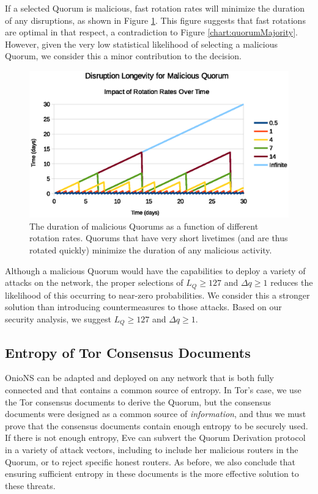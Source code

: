 If a selected Quorum is malicious, fast rotation rates will minimize the duration of any disruptions, as shown in Figure \ref{chart:quorumLongevity}. This figure suggests that fast rotations are optimal in that respect, a contradiction to Figure \ref{chart:quorumMajority}. However, given the very low statistical likelihood of selecting a malicious Quorum, we consider this a minor contribution to the decision.

\begin{figure}[htbp]
	\centering
	\includegraphics[width=1\textwidth]{analysis/MaliciousLongevityRotations.eps}
	\caption{The duration of malicious Quorums as a function of different rotation rates. Quorums that have very short livetimes (and are thus rotated quickly) minimize the duration of any malicious activity.}
	\label{chart:quorumLongevity}
\end{figure}

Although a malicious Quorum would have the capabilities to deploy a variety of attacks on the network, the proper selections of $ L_{Q} \geq 127 $ and $ \Delta q \geq 1 $ reduces the likelihood of this occurring to near-zero probabilities. We consider this a stronger solution than introducing countermeasures to those attacks. Based on our security analysis, we suggest $ L_{Q} \geq 127 $ and $ \Delta q \geq 1 $. 

\subsection{Entropy of Tor Consensus Documents}

OnioNS can be adapted and deployed on any network that is both fully connected and that contains a common source of entropy. In Tor's case, we use the Tor consensus documents to derive the Quorum, but the consensus documents were designed as a common source of \emph{information}, and thus we must prove that the consensus documents contain enough entropy to be securely used. If there is not enough entropy, Eve can subvert the Quorum Derivation protocol in a variety of attack vectors, including to include her malicious routers in the Quorum, or to reject specific honest routers. As before, we also conclude that ensuring sufficient entropy in these documents is the more effective solution to these threats.

